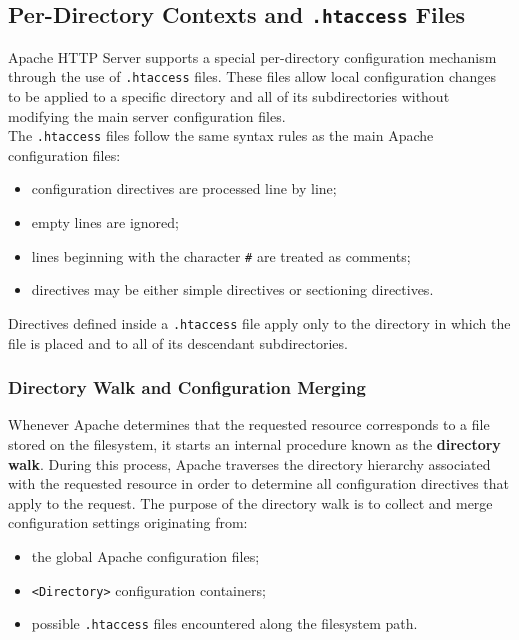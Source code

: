 \documentclass{scrbook}
\begin{document}
	\subsection{Per-Directory Contexts and \texttt{.htaccess} Files}
	
	Apache HTTP Server supports a special per-directory configuration mechanism through the use of \texttt{.htaccess} files. These files allow local configuration changes to be applied to a specific directory and all of its subdirectories without modifying the main server configuration files.\\
	
	The \texttt{.htaccess} files follow the same syntax rules as the main Apache configuration files:
	\begin{itemize}
		\item configuration directives are processed line by line;
		\item empty lines are ignored;
		\item lines beginning with the character \texttt{\#} are treated as comments;
		\item directives may be either simple directives or sectioning directives.
	\end{itemize}
	
	Directives defined inside a \texttt{.htaccess} file apply only to the directory in which the file is placed and to all of its descendant subdirectories.
	
	\subsubsection{Directory Walk and Configuration Merging}
	
	Whenever Apache determines that the requested resource corresponds to a file stored on the filesystem, it starts an internal procedure known as the \textbf{directory walk}. During this process, Apache traverses the directory hierarchy associated with the requested resource in order to determine all configuration directives that apply to the request. The purpose of the directory walk is to collect and merge configuration settings originating from:
	\begin{itemize}
		\item
		the global Apache configuration files;
		
		\item
		\texttt{<Directory>} configuration containers;
		
		\item
		possible \texttt{.htaccess} files encountered along the filesystem path.
	\end{itemize}
	
\end{document}
